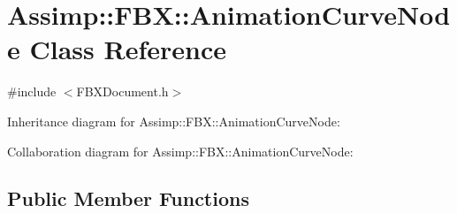 \hypertarget{class_assimp_1_1_f_b_x_1_1_animation_curve_node}{\section{Assimp\+:\+:F\+B\+X\+:\+:Animation\+Curve\+Node Class Reference}
\label{class_assimp_1_1_f_b_x_1_1_animation_curve_node}
}


{\ttfamily \#include $<$F\+B\+X\+Document.\+h$>$}



Inheritance diagram for Assimp\+:\+:F\+B\+X\+:\+:Animation\+Curve\+Node\+:


Collaboration diagram for Assimp\+:\+:F\+B\+X\+:\+:Animation\+Curve\+Node\+:
\subsection*{Public Member Functions}
